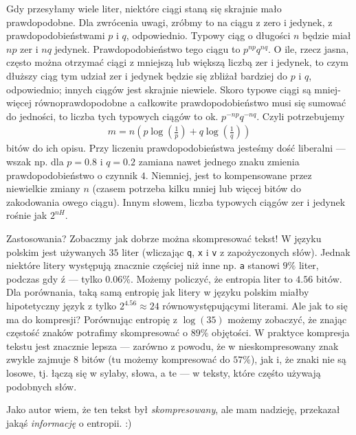 \documentclass[10pt,a4paper]{article}
\begin{document}
Gdy przesyłamy wiele liter, niektóre ciągi staną się skrajnie mało prawdopodobne.
Dla zwrócenia uwagi, zróbmy to na ciągu z zero i jedynek, z prawdopodobieństwami $p$ i $q$, odpowiednio.
Typowy ciąg o długości $n$ będzie miał $n p$ zer i $n q$ jedynek.
Prawdopodobieństwo tego ciągu to $p^{n p}q^{n q}$.
O ile, rzecz jasna, często można otrzymać ciągi z mniejszą lub większą liczbą zer i jedynek,
to czym dłuższy ciąg tym udział zer i jedynek będzie się zbliżał bardziej do $p$ i $q$, odpowiednio;
innych ciągów jest skrajnie niewiele.
Skoro typowe ciągi są mniej-więcej równoprawdopodobne a całkowite prawdopodobieństwo musi się sumować do jedności,
to liczba tych typowych ciągów to ok.
$p^{-n p}q^{-n q}$.
Czyli potrzebujemy
%
\begin{align}
    m=n \left( p \log(\tfrac{1}{p}) + q \log(\tfrac{1}{q}) \right)
\end{align}
%
bitów do ich opisu.
Przy liczeniu prawdopodobieństwa jesteśmy dość liberalni --- wszak np. dla $p=0.8$ i $q=0.2$ zamiana nawet jednego znaku zmienia prawdopodobieństwo o czynnik $4$.
Niemniej, jest to kompensowane przez niewielkie zmiany $n$ (czasem potrzeba kilku mniej lub więcej bitów do zakodowania owego ciągu).
Innym słowem, liczba typowych ciągów zer i jedynek rośnie jak $2^{n H}$.

%
Zastosowania? Zobaczmy jak dobrze można skompresować tekst!
W języku polskim jest używanych $35$ liter (wliczając \texttt{q}, \texttt{x} i \texttt{v} z zapożyczonych słów).
Jednak niektóre litery występują znacznie częściej niż inne np. \texttt{a} stanowi $9\%$ liter, podczas gdy $\texttt{ź}$ --- tylko $0.06\%$.
Możemy policzyć, że entropia liter to $4.56$ bitów.
Dla porównania, taką samą entropię jak litery w języku polskim miałby hipotetyczny język z tylko $2^{4.56}\approx24$ równowystępującymi literami.
Ale jak to się ma do kompresji?
Porównując entropię z $\log(35)$ możemy zobaczyć, że znając częstość znaków potrafimy skompresować o $89\%$ objętości.
W praktyce kompresja tekstu jest znacznie lepsza --- zarówno z powodu, że w nieskompresowany znak zwykle zajmuje $8$ bitów (tu możemy kompresować do $57\%$), jak i, że znaki nie są losowe, tj. łączą się w sylaby, słowa, a te --- w teksty, które częśto używają podobnych słów.

Jako autor wiem, że ten tekst był \emph{skompresowany}, ale mam nadzieję, przekazał jakąś \emph{informację} o entropii. :)
\end{document}
